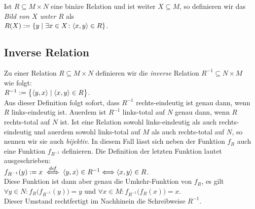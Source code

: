 \begin{Definition}[Bild]
  Ist $R \subseteq M \times N$ eine bin\"{a}re Relation und ist weiter $X \subseteq M$, so
  definieren wir das \emph{Bild von $X$ unter $R$} als \\[0.2cm]
  \hspace*{1.3cm} $R(X) := \{ y \mid \exists x \in X \colon \pair(x,y) \in R \}$. \eox
\end{Definition}

\subsection{Inverse Relation}
Zu einer  Relation $R \subseteq M \times N$ definieren wir die \emph{inverse} Relation 
$R^{-1} \subseteq N \times M$ wie folgt: \\[0.2cm]
\hspace*{1.3cm} $R^{-1} := \bigl\{ \pair(y,x) \mid \pair(x,y) \in R  \bigr\}$. \\[0.2cm]
Aus dieser Definition folgt sofort, dass $R^{-1}$ rechts-eindeutig ist genau dann, wenn
$R$ links-eindeutig ist.  Au\3erdem ist $R^{-1}$ links-total auf $N$ genau dann, wenn $R$
rechts-total auf $N$ ist.  Ist eine Relation sowohl links-eindeutig als auch rechts-eindeutig und
au\3erdem sowohl links-total auf $M$ als auch rechts-total auf $N$, so nennen wir sie auch \emph{bijektiv}.
In diesem Fall l\"{a}sst sich neben der Funktion
$f_R$ auch eine Funktion $f_{R^{-1}}$ definieren.  Die Definition der letzten Funktion
lautet ausgeschrieben: \\[0.2cm]
\hspace*{1.3cm} $f_{R^{-1}}(y) := x \;\stackrel{de\!f}{\Longleftrightarrow}\; \pair(y,x) \in R^{-1} \Longleftrightarrow \pair(x,y) \in R$. \\[0.2cm]
Diese Funktion ist dann aber genau die Umkehr-Funktion von $f_R$, es gilt \\[0.2cm]
\hspace*{1.3cm}
 $\forall y \in N \colon f_R\bigl(f_{R^{-1}}(y)\bigr) = y$ \quad und \quad
 $\forall x \in M \colon f_{R^{-1}}\bigl(f_R(x)\bigr) = x$. \\[0.2cm]
Dieser Umstand rechtfertigt im Nachhinein die Schreibweise $R^{-1}$.

